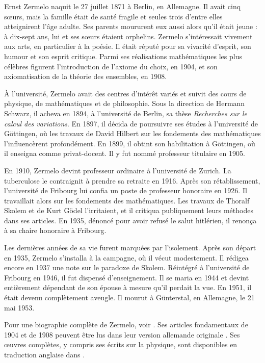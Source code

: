 \documentclass[../../../include/open-logic-section]{subfiles}
\begin{document}



Ernst Zermelo naquit le 27 juillet 1871 à Berlin, en Allemagne. Il
avait cinq sœurs, mais la famille était de santé fragile et seules
trois d'entre elles atteignirent l'âge adulte. Ses parents moururent
eux aussi alors qu'il était jeune : à dix-sept ans, lui et ses sœurs
étaient orphelins. Zermelo s'intéressait vivement aux arts,
en particulier à la poésie. Il était réputé pour sa vivacité d'esprit,
son humour et son esprit critique. Parmi ses réalisations
mathématiques les plus célèbres figurent l'introduction de l'axiome
du choix, en 1904, et son axiomatisation de la théorie des ensembles,
en 1908.

À l'université, Zermelo avait des centres d'intérêt variés et suivit
des cours de physique, de mathématiques et de philosophie. Sous la
direction de Hermann Schwarz, il acheva en 1894, à l'université de
Berlin, sa thèse \emph{Recherches sur le calcul des variations}.
En 1897, il décida de poursuivre ses études à l'université de
G\"{o}ttingen, où les travaux de David
Hilbert sur les fondements des mathématiques l'influencèrent
profondément. En 1899, il obtint son habilitation à Göttingen, où
il enseigna comme privat-docent. Il y fut nommé professeur
titulaire en 1905.

En 1910, Zermelo devint professeur ordinaire à l'université de
Zurich. La tuberculose le contraignit à prendre sa retraite en 1916. Après son rétablissement, l'université de Fribourg
lui confia un poste de professeur honoraire en 1926. Il travaillait
alors sur les fondements des mathématiques. Les travaux de Thoralf
Skolem et de Kurt G\"{o}del l'irritaient, et il critiqua publiquement
leurs méthodes dans ses articles. En 1935, dénoncé pour avoir refusé
le salut hitlérien, il renonça à sa chaire honoraire à Fribourg.
%

Les dernières années de sa vie furent marquées par l'isolement.
Après son départ en 1935, Zermelo s'installa à la campagne, où
il vécut modestement. Il rédigea encore en 1937 une note sur le
paradoxe de Skolem. Réintégré à l'université de Fribourg en 1946,
il fut dispensé d'enseignement. Il se maria en
1944 et devint entièrement dépendant de son épouse à mesure qu'il
perdait la vue. En 1951, il était devenu complètement aveugle.
Il mourut à G\"{u}nterstal, en Allemagne, le 21 mai 1953.

\begin{reading}
Pour une biographie complète de Zermelo, voir \citet{Ebbinghaus2015}.
Ses articles fondamentaux de 1904 et de 1908 peuvent être lus dans
leur version allemande originale
\citep{Zermelo1904,Zermelo1908}. Ses œuvres complètes, y compris ses
écrits sur la physique, sont disponibles en traduction anglaise dans
\citep{Ebbinghaus2010,Ebbinghaus2013}.
\end{reading}
\end{document}
